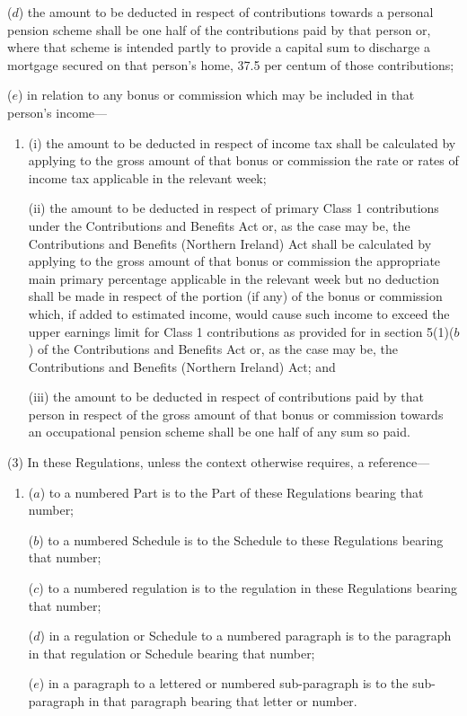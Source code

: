 \documentclass[12pt,a4paper]{article}
\begin{document}
\begin{enumerate}
($d$) the amount to be deducted in respect of contributions towards a personal pension scheme shall be one half of the contributions paid by that person or, where that scheme is intended partly to provide a capital sum to discharge a mortgage secured on that person’s home, 37.5 per centum of those contributions;

($e$) in relation to any bonus or commission which may be included in that person’s income—
\begin{enumerate}\item[]
(i) the amount to be deducted in respect of income tax shall be calculated by applying to the gross amount of that bonus or commission the rate or rates of income tax applicable in the relevant week;

(ii) the amount to be deducted in respect of primary Class 1 contributions under the Contributions and Benefits Act 
or, as the case may be, the Contributions and Benefits (Northern Ireland) Act  %
shall be calculated by applying to the gross amount of that bonus or commission the appropriate main primary percentage applicable in the relevant week
but no deduction shall be made in respect of the portion (if any) of the bonus or commission which, if added to estimated income, would cause such income to exceed the upper earnings limit for Class 1 contributions as provided for in section 5(1)($b$) of the Contributions and Benefits Act %
or, as the case may be, the Contributions and Benefits (Northern Ireland) Act;  %
and

(iii) the amount to be deducted in respect of contributions paid by that person in respect of the gross amount of that bonus or commission towards an occupational pension scheme shall be one half of any sum so paid.
\end{enumerate}
\end{enumerate}

(3) In these Regulations, unless the context otherwise requires, a reference—
\begin{enumerate}\item[]
($a$) to a numbered Part is to the Part of these Regulations bearing that number;

($b$) to a numbered Schedule is to the Schedule to these Regulations bearing that number;

($c$) to a numbered regulation is to the regulation in these Regulations bearing that number;

($d$) in a regulation or Schedule to a numbered paragraph is to the paragraph in that regulation or Schedule bearing that number;

($e$) in a paragraph to a lettered or numbered sub-paragraph is to the sub-paragraph in that paragraph bearing that letter or number.
\end{enumerate}
\end{document}
